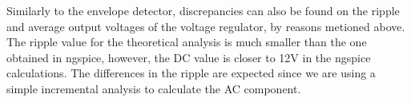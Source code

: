 \par Similarly to the envelope detector, discrepancies can also be found on the ripple and
average output voltages of the voltage regulator, by reasons metioned above. The ripple value for the theoretical analysis is much smaller than the one obtained in ngspice, however, the DC value is closer to 12V in the ngspice calculations. The differences in the ripple are expected since we are using a simple incremental analysis to calculate the AC component.

